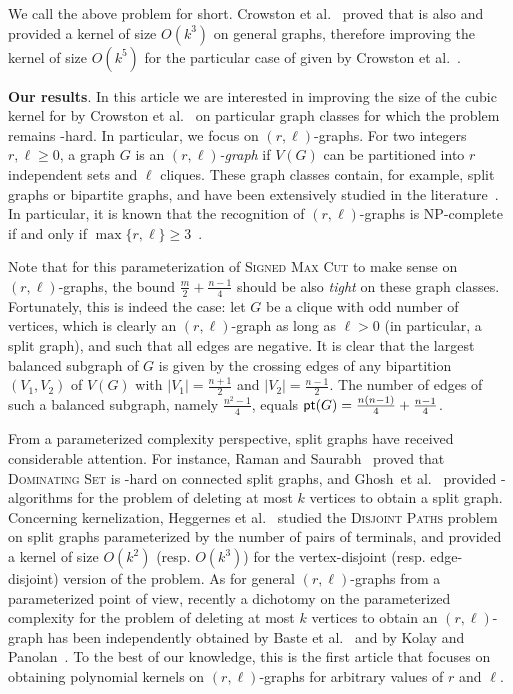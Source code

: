 \documentclass[
final
]{dmtcs-episciences}
\begin{document}
We call the above problem {} for short. Crowston et al.~\cite{crowston2013maximum} proved that {} is also {}  and provided a kernel of size
 $O(k^3)$ on general graphs, therefore improving the kernel of size
 $O(k^5)$ for the particular case of {} given by Crowston et al.~\cite{crowston2012max}.

\vspace{.15cm}\noindent
\textbf{Our results}. In this article we are interested in improving the size of the cubic kernel for {} by Crowston et al.~\cite{crowston2013maximum} on particular graph classes for which the problem remains {}-hard. In particular, we focus on $(r,\ell)$-graphs. For two integers $r,\ell \geq 0$, a graph $G$ is an \emph{$(r,\ell)$-graph} if $V(G)$ can be partitioned into $r$ independent sets and $\ell$ cliques. These graph classes contain, for example, split graphs or bipartite graphs, and have been extensively studied in the literature~\cite{FoHa77,Golumbic04,book-graph-classes,Bra96,FHKM03,BFKS15,KoPa15}. In particular,
it is known that the recognition of $(r,\ell)$-graphs is {\sf NP}-complete if and only if $\max\{r,\ell\} \geq 3$~\cite{Bra96,FHKM03}.


Note that for this parameterization of  \textsc{Signed Max Cut} to make sense on $(r,\ell)$-graphs, the bound $\frac{m}{2}+\frac{n-1}{4}$ should be also {\sl tight} on these graph classes. Fortunately, this is indeed the case: let $G$ be a clique with odd number of vertices, which is clearly an $(r,\ell)$-graph as long as $\ell > 0$ (in particular, a split graph), and such that all edges are negative. It is clear that the largest balanced subgraph of $G$ is given by the crossing edges of any bipartition $(V_1,V_2)$ of $V(G)$ with $|V_1|= \frac{n+1}{2}$ and $|V_2|= \frac{n-1}{2}$. The number of edges of such a balanced subgraph, namely  $\frac{n^2-1}{4}$, equals  ${\sf pt}(G) = \frac{n(n-1)}{4}+ \frac{n-1}{4}$.


From a parameterized complexity perspective, split graphs have received considerable attention. For instance, Raman and Saurabh~\cite{RamanS08} proved that \textsc{Dominating Set} is {}-hard on connected split graphs, and Ghosh~et al.~\cite{GhoshK0MPRR15} provided  {}-algorithms for the problem of deleting at most $k$ vertices to obtain a split graph. Concerning kernelization, Heggernes et al.~\cite{HeggernesHLS15} studied the \textsc{Disjoint Paths} problem on split graphs parameterized by the number of pairs of terminals, and provided a kernel of size $O(k^2)$ (resp. $O(k^3)$) for the vertex-disjoint (resp. edge-disjoint) version of the problem. As for general $(r,\ell)$-graphs from a parameterized point of view, recently a dichotomy on the parameterized complexity for the problem of deleting at most $k$ vertices to obtain an $(r,\ell)$-graph has been independently obtained by Baste et al.~\cite{BFKS15} and by Kolay and Panolan~\cite{KoPa15}. To the best of our knowledge, this is the first article that focuses on obtaining polynomial kernels on $(r,\ell)$-graphs for arbitrary values of $r$ and $\ell$.
\end{document}
